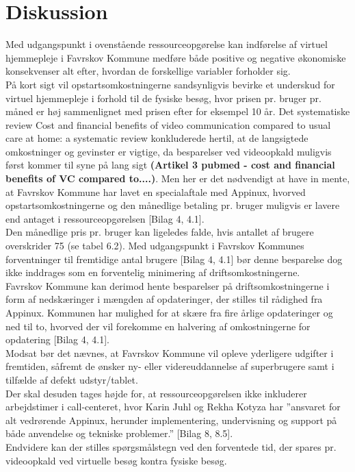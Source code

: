 \section{Diskussion}
Med udgangspunkt i ovenstående ressourceopgørelse kan indførelse af virtuel hjemmepleje i Favrskov Kommune medføre både positive og negative økonomiske konsekvenser alt efter, hvordan de forskellige variabler forholder sig. \\
På kort sigt vil opstartsomkostningerne sandsynligvis bevirke et underskud for virtuel hjemmepleje i forhold til de fysiske besøg, hvor prisen pr. bruger pr. måned er høj sammenlignet med prisen efter for eksempel 10 år. Det systematiske review Cost and financial benefits of video communication compared to usual care at home: a systematic review konkluderede hertil, at de langsigtede omkostninger og gevinster er vigtige, da besparelser ved videoopkald muligvis først kommer til syne på lang sigt \textbf{(Artikel 3 pubmed - cost and financial benefits of VC compared to....)}. Men her er det nødvendigt at have in mente, at Favrskov Kommune har lavet en specialaftale med Appinux, hvorved opstartsomkostningerne og den månedlige betaling pr. bruger muligvis er lavere end antaget i ressourceopgørelsen [Bilag 4, 4.1]. \\
Den månedlige pris pr. bruger kan ligeledes falde, hvis antallet af brugere overskrider 75 (se tabel 6.2). Med udgangspunkt i Favrskov Kommunes forventninger til fremtidige antal brugere [Bilag 4, 4.1] bør denne besparelse dog ikke inddrages som en forventelig minimering af driftsomkostningerne. \\
Favrskov Kommune kan derimod hente besparelser på driftsomkostningerne i form af nedskæringer i mængden af opdateringer, der stilles til rådighed fra Appinux. Kommunen har mulighed for at skære fra fire årlige opdateringer og ned til to, hvorved der vil forekomme en halvering af omkostningerne for opdatering [Bilag 4, 4.1].\\
Modsat bør det nævnes, at Favrskov Kommune vil opleve yderligere udgifter i fremtiden, såfremt de ønsker ny- eller videreuddannelse af superbrugere samt i tilfælde af defekt udstyr/tablet.  \\
Der skal desuden tages højde for, at ressourceopgørelsen ikke inkluderer arbejdstimer i call-centeret, hvor Karin Juhl og Rekha Kotyza har ”ansvaret for alt vedrørende Appinux, herunder implementering, undervisning og support på både anvendelse og tekniske problemer.” [Bilag 8, 8.5].\\
Endvidere kan der stilles spørgsmålstegn ved den forventede tid, der spares pr. videoopkald ved virtuelle besøg kontra fysiske besøg. \\
